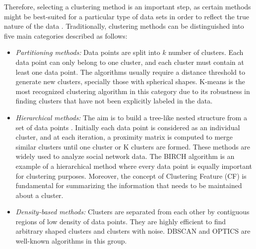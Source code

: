 Therefore, selecting a clustering method is an important step, as certain methods might be best-suited for a particular type of data sets in order to reflect the true nature of the data \cite{berkhin2006survey, han2011data}. Traditionally, clustering methods can be distinguished into five main categories described as follows: 


\begin{itemize}

    \item\textit{Partitioning methods:} Data points are split into $k$ number of clusters. Each data point can only belong to one cluster, and each cluster must contain at least one data point. The algorithms usually require a distance threshold %
    to generate new clusters, specially those with spherical shapes.   %
    K-means is the most recognized clustering algorithm in this category due to its robustness in finding clusters that have not been explicitly labeled in the data.
    
    \item\textit{Hierarchical methods:} The aim is to build a tree-like nested structure from a set of data points \cite{swarndeep2016overview}. Initially each data point is considered as an individual cluster, and at each iteration, a proximity matrix is computed to merge similar clusters until one cluster or K clusters are formed. These methods are widely used to analyze social network data. The BIRCH algorithm is an example of a hierarchical method where every data point is equally important for clustering purposes. Moreover, the concept of Clustering Feature (CF) is fundamental for summarizing the information that needs to be maintained about a cluster.
    
    
    \item\textit{Density-based methods:} Clusters are separated from each other by contiguous regions of low density of data points. They are highly efficient to find arbitrary shaped clusters and clusters with noise.  DBSCAN and OPTICS are well-known algorithms in this group.
    

\end{itemize}
